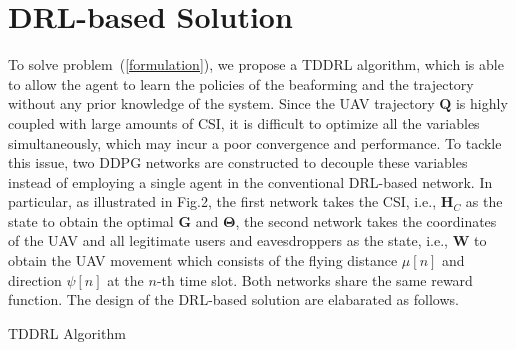 \documentclass[12pt, draftclsnofoot, onecolumn]{IEEEtran}
\begin{document}
\section{DRL-based Solution}
To solve problem~(\ref{formulation}), we propose a TDDRL algorithm, which is able to allow the agent to learn the policies of the beaforming and the trajectory without any prior knowledge of the system. Since the UAV trajectory ${\bm Q}$ is highly coupled with large amounts of CSI, it is difficult to optimize all the variables simultaneously, which may incur a poor convergence and performance. To tackle this issue, two DDPG networks are constructed to decouple these variables instead of employing a single agent in the conventional DRL-based network. In particular, as illustrated in Fig.2, the first network takes the CSI, i.e., ${\bm H}_{C}$ as the state to obtain the optimal $\bm{G} $ and $\bm{\Theta} $, the second network takes the coordinates of the UAV and all legitimate users and eavesdroppers as the state, i.e., ${\bm W} $ to obtain the UAV movement which consists of the flying distance $\mu[n]$ and direction $\psi[n]$ at the $n$-th time slot. Both networks share the same reward function. The design of the DRL-based solution are elabarated as follows.

\begin{algorithm}[t]
	\caption{TDDRL Algorithm}
	\begin{algorithmic}[1]
      
      \ENDFOR
    \ENDFOR
	\end{algorithmic}
\end{algorithm}
\end{document}
